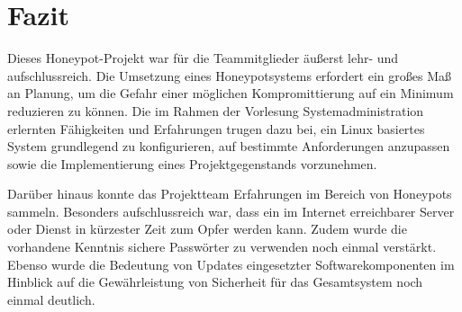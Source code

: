 \chapter{Fazit}
\label{ch:Fazit}






Dieses Honeypot-Projekt war für die Teammitglieder äußerst lehr- und aufschlussreich. Die Umsetzung eines Honeypotsystems erfordert ein großes Maß an Planung, um die Gefahr einer möglichen Kompromittierung auf ein Minimum reduzieren zu können. Die im Rahmen der Vorlesung Systemadministration erlernten Fähigkeiten und Erfahrungen trugen dazu bei, ein Linux basiertes System grundlegend zu konfigurieren, auf bestimmte Anforderungen anzupassen sowie die Implementierung eines Projektgegenstands vorzunehmen.

Darüber hinaus konnte das Projektteam Erfahrungen im Bereich von Honeypots sammeln. Besonders aufschlussreich war, dass ein im Internet erreichbarer Server oder Dienst in kürzester Zeit zum Opfer werden kann. Zudem wurde die vorhandene Kenntnis sichere Passwörter zu verwenden noch einmal verstärkt. Ebenso wurde die Bedeutung von Updates eingesetzter Softwarekomponenten im Hinblick auf die Gewährleistung von Sicherheit für das Gesamtsystem noch einmal deutlich.
